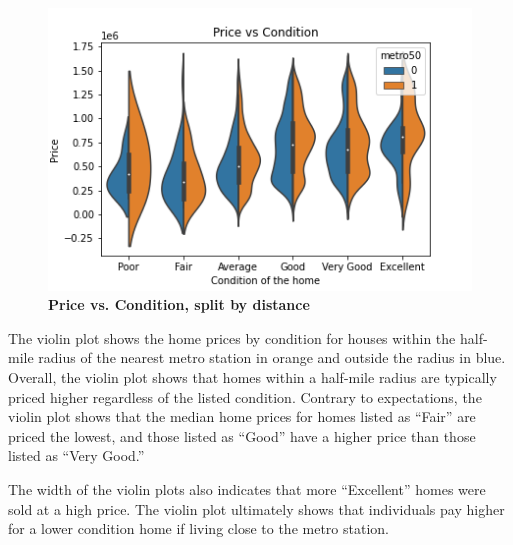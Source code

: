 \documentclass[12pt]{report}
\begin{document}
\begin{figure}[h]
\begin{center}
\includegraphics[width=130mm]{ConditionViolin.png}
\end{center}
\caption{\textbf{Price vs. Condition, split by distance}}
\label{fig:cndVio}
\end{figure}
The violin plot shows the home prices by condition for houses within the half-mile radius of the nearest metro station in orange and outside the radius in blue. Overall, the violin plot shows that homes within a half-mile radius are typically priced higher regardless of the listed condition. Contrary to expectations, the violin plot shows that the median home prices for homes listed as “Fair” are priced the lowest, and those listed as “Good” have a higher price than those listed as “Very Good.” 

The width of the violin plots also indicates that more “Excellent” homes were sold at a high price. The violin plot ultimately shows that individuals pay higher for a lower condition home if living close to the metro station. 
\clearpage
\end{document}

